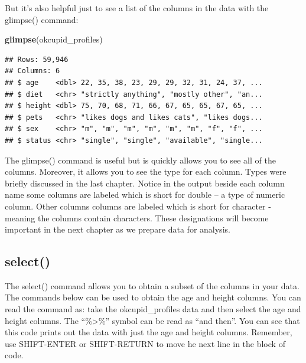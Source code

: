 \documentclass[
]{krantz}
\makeatletter
\newenvironment{Shaded}{\begin{snugshade}}{\end{snugshade}}
\newcommand{\KeywordTok}[1]{\textcolor[rgb]{0.27,0.27,0.27}{\textbf{#1}}}
\newcommand{\NormalTok}[1]{#1}
\newcommand{\OperatorTok}[1]{\textcolor[rgb]{0.43,0.43,0.43}{\textbf{#1}}}
\newcommand{\StringTok}[1]{\textcolor[rgb]{0.5,0.5,0.5}{#1}}
\newenvironment{kframe}{%
\medskip{}
\setlength{\fboxsep}{.8em}
 \def\at@end@of@kframe{}%
 \ifinner\ifhmode%
  \def\at@end@of@kframe{\end{minipage}}%
  \begin{minipage}{\columnwidth}%
 \fi\fi%
 \def\FrameCommand##1{\hskip\@totalleftmargin \hskip-\fboxsep
 \colorbox{shadecolor}{##1}\hskip-\fboxsep
     \hskip-\linewidth \hskip-\@totalleftmargin \hskip\columnwidth}%
 \MakeFramed {\advance\hsize-\width
   \@totalleftmargin\z@ \linewidth\hsize
   \@setminipage}}%
 {\par\unskip\endMakeFramed%
 \at@end@of@kframe}
\renewenvironment{Shaded}{\begin{kframe}}{\end{kframe}}
\makeatother
\begin{document}
But it's also helpful just to see a list of the columns in the data with the glimpse() command:

\begin{Shaded}
\begin{Highlighting}[]
\KeywordTok{glimpse}\NormalTok{(okcupid_profiles)}
\end{Highlighting}
\end{Shaded}

\begin{verbatim}
## Rows: 59,946
## Columns: 6
## $ age    <dbl> 22, 35, 38, 23, 29, 29, 32, 31, 24, 37, ...
## $ diet   <chr> "strictly anything", "mostly other", "an...
## $ height <dbl> 75, 70, 68, 71, 66, 67, 65, 65, 67, 65, ...
## $ pets   <chr> "likes dogs and likes cats", "likes dogs...
## $ sex    <chr> "m", "m", "m", "m", "m", "m", "f", "f", ...
## $ status <chr> "single", "single", "available", "single...
\end{verbatim}

The glimpse() command is useful but is quickly allows you to see all of the columns. Moreover, it allows you to see the type for each column. Types were briefly discussed in the last chapter. Notice in the output beside each column name some columns are labeled which is short for double -- a type of numeric column. Other columns columns are labeled which is short for character - meaning the columns contain characters. These designations will become important in the next chapter as we prepare data for analysis.

\hypertarget{select}{%
\subsection{select()}\label{select}}

The select() command allows you to obtain a subset of the columns in your data. The commands below can be used to obtain the age and height columns. You can read the command as: take the okcupid\_profiles data and then select the age and height columns. The ``\%\textgreater\%'' symbol can be read as ``and then''. You can see that this code prints out the data with just the age and height columns. Remember, use SHIFT-ENTER or SHIFT-RETURN to move he next line in the block of code.

\begin{Shaded}
\end{Shaded}
\end{document}

